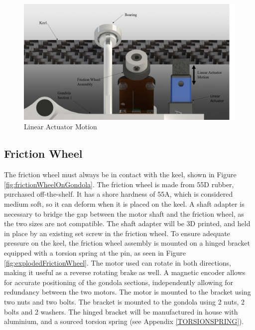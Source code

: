 \documentclass[../main.tex]{subfiles}
\begin{document}
\begin{figure}[H]
	\centering
	\includegraphics[width=.8\linewidth]{img/design/gondola/linearActuatorAndMotor.png}
	\caption{Linear Actuator Motion}
	\label{fig:linearActuatorAndMotor}
\end{figure}

\subsection{Friction Wheel}
The friction wheel must always be in contact with the keel, shown in Figure \ref{fig:frictionWheelOnGondola}. The friction wheel is made from 55D rubber, purchased off-the-shelf. It has a shore hardness of 55A, which is considered medium soft, so it can deform when it is placed on the keel. A shaft adapter is necessary to bridge the gap between the motor shaft and the friction wheel, as the two sizes are not compatible. The shaft adapter will be 3D printed, and held in place by an existing set screw in the friction wheel. To ensure adequate pressure on the keel, the friction wheel assembly is mounted on a hinged bracket equipped with a torsion spring at the pin, as seen in Figure \ref{fig:explodedFrictionWheel}. The motor used can rotate in both directions, making it useful as a reverse rotating brake as well. A magnetic encoder allows for accurate positioning of the gondola sections, independently allowing for redundancy between the two motors. The motor is mounted to the bracket using two nuts and two bolts. The bracket is mounted to the gondola using 2 nuts, 2 bolts and 2 washers. The hinged bracket will be manufactured in house with aluminium, and a sourced torsion spring (see Appendix \ref{TORSIONSPRING}).
\end{document}
